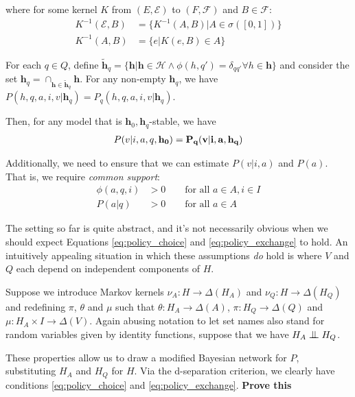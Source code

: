 where for some kernel $K$ from $(E,\mathcal{E})$ to $(F,\mathcal{F})$ and $B\in \mathcal{F}$:
\begin{align}
    K^{-1}(\mathcal{E},B) &= \{K^{-1}(A,B)|A\in\sigma([0,1])\} \\
    K^{-1}(A,B) &= \{e|K(e,B)\in A\}
\end{align}

For each $q\in Q$, define $\tilde{\mathbf{h}}_q=\{\mathbf{h}|\mathbf{h}\in \mathcal{H}\wedge \phi(h,q')=\delta_{qq'}\forall h\in \mathbf{h}\}$ and consider the set $\mathbf{h}_q=\cap_{\mathbf{h}\in \tilde{\mathbf{h}}_q}\mathbf{h}$. For any non-empty $\mathbf{h}_q$, we have $P(h,q,a,i,v|\mathbf{h}_q)=P_q(h,q,a,i,v|\mathbf{h}_q)$. 

Then, for any model that is $\mathbf{h}_0,\mathbf{h}_q$-stable, we have
\begin{align}
    P(v|i,a,q,\bf{h}_0) = P_q(v|i,a,\bf{h}_q)
\end{align}



Additionally, we need to ensure that we can estimate $P(v|i,a)$ and $P(a)$. That is, we require \emph{common support}:
\begin{align}
    \phi(a,q,i) &> 0  \qquad \text{for all }a\in A, i\in I \\
    P(a|q) &> 0 \qquad \text{for all }a\in A
\end{align}

The setting so far is quite abstract, and it's not necessarily obvious when we should expect Equations \ref{eq:policy_choice} and \ref{eq:policy_exchange} to hold. An intuitively appealing situation in which these assumptions \emph{do} hold is where $V$ and $Q$ each depend on independent components of $H$.

Suppose we introduce Markov kernels $\nu_A:H\to\Delta(H_A)$ and $\nu_Q:H\to\Delta(H_Q)$ and redefining $\pi$, $\theta$ and $\mu$ such that $\theta:H_A\to \Delta(A)$, $\pi:H_Q\to \Delta(Q)$ and $\mu:H_A\times I\to \Delta (V)$. Again abusing notation to let set names also stand for random variables given by identity functions, suppose that we have $H_A \CI H_Q$.

These properties allow us to draw a modified Bayesian network for $P$, substituting $H_A$ and $H_Q$ for $H$. Via the d-separation criterion, we clearly have conditions \ref{eq:policy_choice} and \ref{eq:policy_exchange}.
\textbf{Prove this}

